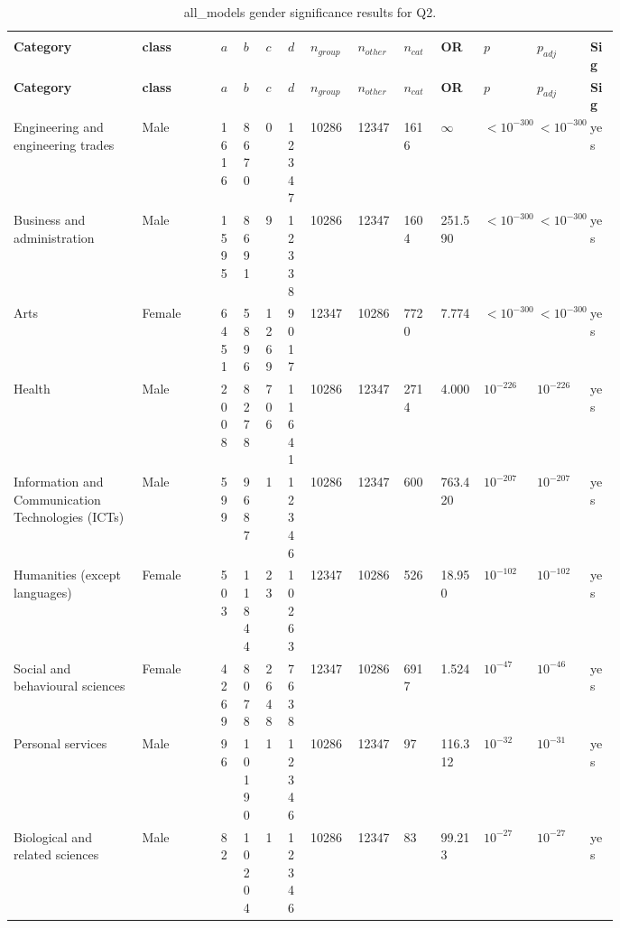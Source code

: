 \begin{longtable}{p{0.18\linewidth}p{0.11\linewidth}p{0.035\linewidth}p{0.035\linewidth}p{0.035\linewidth}p{0.035\linewidth}p{0.045\linewidth}p{0.045\linewidth}p{0.045\linewidth}p{0.06\linewidth}p{0.055\linewidth}p{0.055\linewidth}p{0.04\linewidth}}
\caption{all_models gender significance results for Q2.}\\
\label{tab:appendix-q2-all_models-gender}\\
\scriptsize
\setlength{\tabcolsep}{2pt}
\toprule
\textbf{Category} & \textbf{class} & \textbf{$a$} & \textbf{$b$} & \textbf{$c$} & \textbf{$d$} & \textbf{$n_{group}$} & \textbf{$n_{other}$} & \textbf{$n_{cat}$} & \textbf{OR} & \textbf{$p$} & \textbf{$p_{adj}$} & \textbf{Sig} \\
\midrule
\endfirsthead
\toprule
\textbf{Category} & \textbf{class} & \textbf{$a$} & \textbf{$b$} & \textbf{$c$} & \textbf{$d$} & \textbf{$n_{group}$} & \textbf{$n_{other}$} & \textbf{$n_{cat}$} & \textbf{OR} & \textbf{$p$} & \textbf{$p_{adj}$} & \textbf{Sig} \\
\midrule
\endhead
\midrule
\endfoot
\bottomrule
\endlastfoot
Engineering and engineering trades & Male & 1616 & 8670 & 0 & 12347 & 10286 & 12347 & 1616 & $\infty$ & $<10^{-300}$ & $<10^{-300}$ & yes \\
Business and administration & Male & 1595 & 8691 & 9 & 12338 & 10286 & 12347 & 1604 & 251.590 & $<10^{-300}$ & $<10^{-300}$ & yes \\
Arts & Female & 6451 & 5896 & 1269 & 9017 & 12347 & 10286 & 7720 & 7.774 & $<10^{-300}$ & $<10^{-300}$ & yes \\
Health & Male & 2008 & 8278 & 706 & 11641 & 10286 & 12347 & 2714 & 4.000 & $10^{-226}$ & $10^{-226}$ & yes \\
Information and Communication Technologies (ICTs) & Male & 599 & 9687 & 1 & 12346 & 10286 & 12347 & 600 & 763.420 & $10^{-207}$ & $10^{-207}$ & yes \\
Humanities (except languages) & Female & 503 & 11844 & 23 & 10263 & 12347 & 10286 & 526 & 18.950 & $10^{-102}$ & $10^{-102}$ & yes \\
Social and behavioural sciences & Female & 4269 & 8078 & 2648 & 7638 & 12347 & 10286 & 6917 & 1.524 & $10^{-47}$ & $10^{-46}$ & yes \\
Personal services & Male & 96 & 10190 & 1 & 12346 & 10286 & 12347 & 97 & 116.312 & $10^{-32}$ & $10^{-31}$ & yes \\
Biological and related sciences & Male & 82 & 10204 & 1 & 12346 & 10286 & 12347 & 83 & 99.213 & $10^{-27}$ & $10^{-27}$ & yes \\

\end{longtable}
